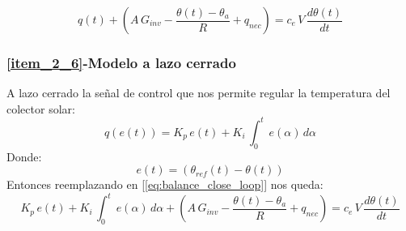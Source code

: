 \begin{equation}
   q(t)+ \left(A\,G_{inv}-\dfrac{\theta(t)-\theta_{a}}{R} + q_{nec}\right)=c_e\,V\,\dfrac{d\theta(t)}{dt}
   \label{eq:balance_close_loop}
\end{equation}

\subsubsection{\ref{item_2_6}-Modelo a lazo cerrado}
A lazo cerrado la señal de control que nos permite regular la temperatura del colector solar:
\begin{equation}
   q(e(t))=K_p\,e(t)+K_i\,\int_0^{t}\,e(\alpha)\,d\alpha
\end{equation}
Donde:
\begin{equation}
   e(t) = (\theta_{ref}(t)-\theta(t))
\end{equation}
Entonces reemplazando en [\ref{eq:balance_close_loop}] nos queda:
\begin{equation}
   K_p\,e(t)+K_i\,\int_0^{t}\,e(\alpha)\,d\alpha + \left(A\,G_{inv}-\dfrac{\theta(t)-\theta_{a}}{R} + q_{nec}\right)=
   c_e\,V\,\dfrac{d\theta(t)}{dt}
   \label{eq:close_loop}
\end{equation}

